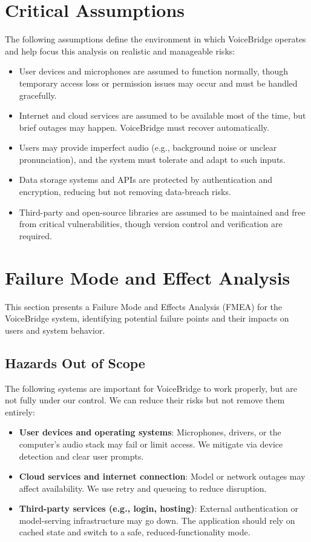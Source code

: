 \documentclass{article}
\begin{document}
\section{Critical Assumptions}

The following assumptions define the environment in which VoiceBridge operates and help focus this analysis on realistic and manageable risks:

\begin{itemize}
    \item User devices and microphones are assumed to function normally, though temporary access loss or permission issues may occur and must be handled gracefully.
    
    \item Internet and cloud services are assumed to be available most of the time, but brief outages may happen. VoiceBridge must recover automatically.
    
    \item Users may provide imperfect audio (e.g., background noise or unclear pronunciation), and the system must tolerate and adapt to such inputs.
    
    \item Data storage systems and APIs are protected by authentication and encryption, reducing but not removing data-breach risks.
    
    \item Third-party and open-source libraries are assumed to be maintained and free from critical vulnerabilities, though version control and verification are required.
\end{itemize}


\section{Failure Mode and Effect Analysis}
This section presents a Failure Mode and Effects Analysis (FMEA) for the VoiceBridge system, identifying potential failure points and their impacts on users and system behavior. 


\subsection{Hazards Out of Scope}

The following systems are important for VoiceBridge to work properly, but are not fully under our control. We can reduce their risks but not remove them entirely:

\begin{itemize}
    \item \textbf{User devices and operating systems}: Microphones, drivers, or the computer's audio stack may fail or limit access. We mitigate via device detection and clear user prompts.
    \item \textbf{Cloud services and internet connection}: Model or network outages may affect availability. We use retry and queueing to reduce disruption.
    \item \textbf{Third-party services (e.g., login, hosting)}: External authentication or model-serving infrastructure may go down. The application should rely on cached state and switch to a safe, reduced-functionality mode.
\end{itemize}
\end{document}
